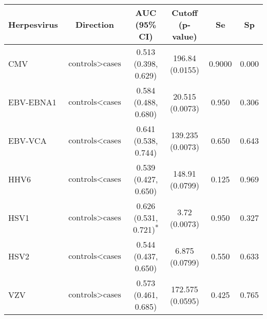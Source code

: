 \begin{tabular}{lccccc}
\toprule
Herpesvirus & Direction & AUC (95\% CI) & Cutoff (p-value) & Se & Sp \\
\midrule
CMV         & $\text{controls}>\text{cases}$ & 0.513 (0.398, 0.629) & 196.84 (0.0155) & 0.9000 & 0.000 \\
EBV-EBNA1   & $\text{controls}<\text{cases}$ & 0.584 (0.488, 0.680) & 20.515 (0.0073) & 0.950 & 0.306 \\
EBV-VCA     & $\text{controls}<\text{cases}$ & 0.641 (0.538, 0.744) & 139.235 (0.0073) & 0.650 & 0.643 \\
HHV6        & $\text{controls}<\text{cases}$ & 0.539 (0.427, 0.650) & 148.91 (0.0799) & 0.125 & 0.969 \\
HSV1        & $\text{controls}>\text{cases}$ & 0.626 (0.531, 0.721)\textsuperscript{${\ast}$} & 3.72 (0.0073) & 0.950 & 0.327 \\
HSV2        & $\text{controls}<\text{cases}$ & 0.544 (0.437, 0.650) & 6.875 (0.0799) & 0.550 & 0.633 \\
VZV         & $\text{controls}>\text{cases}$ & 0.573 (0.461, 0.685) & 172.575 (0.0595) & 0.425 & 0.765 \\
\bottomrule
\end{tabular}
